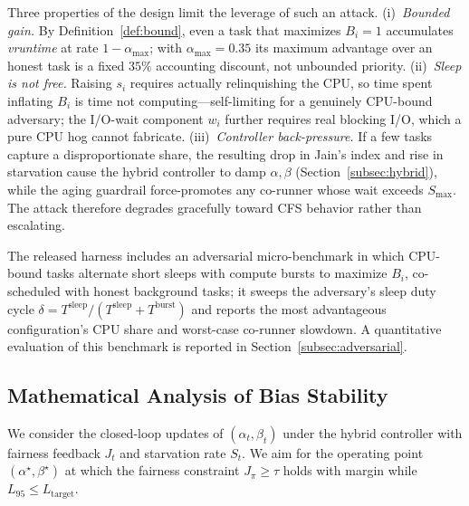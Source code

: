 Three properties of the design limit the leverage of such an attack. (i)~\emph{Bounded gain.} By Definition~\ref{def:bound}, even a task that maximizes $B_i\!=\!1$ accumulates \textit{vruntime} at rate $1-\alpha_{\max}$; with $\alpha_{\max}=0.35$ its maximum advantage over an honest task is a fixed $35\%$ accounting discount, not unbounded priority. (ii)~\emph{Sleep is not free.} Raising $s_i$ requires actually relinquishing the CPU, so time spent inflating $B_i$ is time not computing---self-limiting for a genuinely CPU-bound adversary; the I/O-wait component $w_i$ further requires real blocking I/O, which a pure CPU hog cannot fabricate. (iii)~\emph{Controller back-pressure.} If a few tasks capture a disproportionate share, the resulting drop in Jain's index and rise in starvation cause the hybrid controller to damp $\alpha,\beta$ (Section~\ref{subsec:hybrid}), while the aging guardrail force-promotes any co-runner whose wait exceeds $S_{\max}$. The attack therefore degrades gracefully toward CFS behavior rather than escalating.

The released harness includes an adversarial micro-benchmark in which CPU-bound tasks alternate short sleeps with compute bursts to maximize $B_i$, co-scheduled with honest background tasks; it sweeps the adversary's sleep duty cycle $\delta = T^{\text{sleep}}/(T^{\text{sleep}}+T^{\text{burst}})$ and reports the most advantageous configuration's CPU share and worst-case co-runner slowdown.
A quantitative evaluation of this benchmark is reported in Section~\ref{subsec:adversarial}.


\subsection{Mathematical Analysis of Bias Stability}
\label{subsec:math-stability}

We consider the closed-loop updates of $(\alpha_t, \beta_t)$ under the hybrid controller with fairness feedback $J_t$ and starvation rate $S_t$. We aim for the operating point $(\alpha^{\star}, \beta^{\star})$ at which the fairness constraint $J_{\pi} \geq \tau$ holds with margin while $L_{95}\le L_{\text{target}}$.

